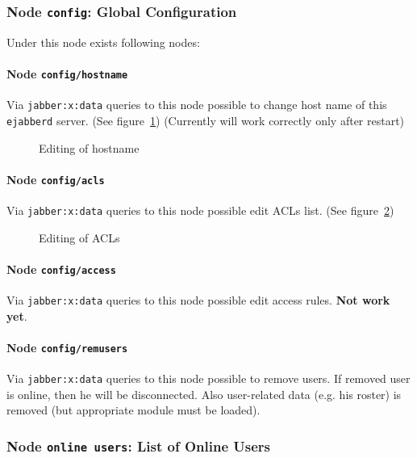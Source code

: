 \documentclass[10pt]{article}
\newcommand{\ns}[1]{\texttt{#1}}
\newcommand{\ejabberd}{\texttt{ejabberd}}
\begin{document}
\subsubsection{Node \texttt{config}: Global Configuration}

Under this node exists following nodes:

\paragraph{Node \texttt{config/hostname}}

Via \ns{jabber:x:data} queries to this node possible to change host name of
this \ejabberd{} server. (See figure~\ref{fig:hostname}) (Currently will work
correctly only after restart)
\begin{figure}[htbp]
  \caption{Editing of hostname}
  \label{fig:hostname}
\end{figure}


\paragraph{Node \texttt{config/acls}}

Via \ns{jabber:x:data} queries to this node possible edit ACLs list.  (See
figure~\ref{fig:acls})
\begin{figure}[htbp]
  \caption{Editing of ACLs}
  \label{fig:acls}
\end{figure}


\paragraph{Node \texttt{config/access}}

Via \ns{jabber:x:data} queries to this node possible edit access rules.
\textbf{Not work yet}.

\paragraph{Node \texttt{config/remusers}}

Via \ns{jabber:x:data} queries to this node possible to remove users.  If
removed user is online, then he will be disconnected.  Also user-related data
(e.g. his roster) is removed (but appropriate module must be loaded).




\subsubsection{Node \texttt{online users}: List of Online Users}
\end{document}
